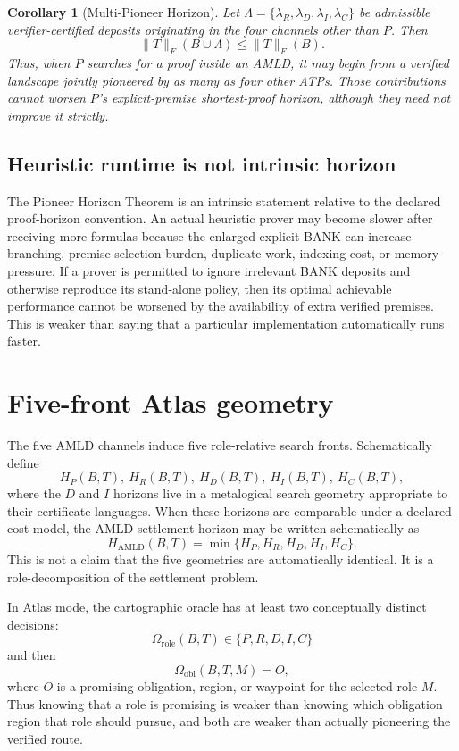 \documentclass[11pt]{article}
\newtheorem{corollary}[definition]{Corollary}
\theoremstyle{remark}
\newcommand{\AMLD}{\mathrm{AMLD}}
\begin{document}
\begin{corollary}[Multi-Pioneer Horizon]
Let $\Lambda=\{\lambda_R,\lambda_D,\lambda_I,\lambda_C\}$ be admissible verifier-certified deposits originating in the four channels other than $P$. Then
\[
\lVert T\rVert_F(B\cup\Lambda)\le\lVert T\rVert_F(B).
\]
Thus, when $P$ searches for a proof inside an AMLD, it may begin from a verified landscape jointly pioneered by as many as four other ATPs. Those contributions cannot worsen $P$'s explicit-premise shortest-proof horizon, although they need not improve it strictly.
\end{corollary}

\subsection{Heuristic runtime is not intrinsic horizon}
The Pioneer Horizon Theorem is an intrinsic statement relative to the declared proof-horizon convention. An actual heuristic prover may become slower after receiving more formulas because the enlarged explicit BANK can increase branching, premise-selection burden, duplicate work, indexing cost, or memory pressure. If a prover is permitted to ignore irrelevant BANK deposits and otherwise reproduce its stand-alone policy, then its optimal achievable performance cannot be worsened by the availability of extra verified premises. This is weaker than saying that a particular implementation automatically runs faster.

\section{Five-front Atlas geometry}
The five AMLD channels induce five role-relative search fronts. Schematically define
\[
H_P(B,T),\ H_R(B,T),\ H_D(B,T),\ H_I(B,T),\ H_C(B,T),
\]
where the $D$ and $I$ horizons live in a metalogical search geometry appropriate to their certificate languages. When these horizons are comparable under a declared cost model, the AMLD settlement horizon may be written schematically as
\[
H_{\AMLD}(B,T)=\min\{H_P,H_R,H_D,H_I,H_C\}.
\]
This is not a claim that the five geometries are automatically identical. It is a role-decomposition of the settlement problem.

In Atlas mode, the cartographic oracle has at least two conceptually distinct decisions:
\[
\Omega_{\mathrm{role}}(B,T)\in\{P,R,D,I,C\}
\]
and then
\[
\Omega_{\mathrm{obl}}(B,T,M)=O,
\]
where $O$ is a promising obligation, region, or waypoint for the selected role $M$. Thus knowing that a role is promising is weaker than knowing which obligation region that role should pursue, and both are weaker than actually pioneering the verified route.
\end{document}

